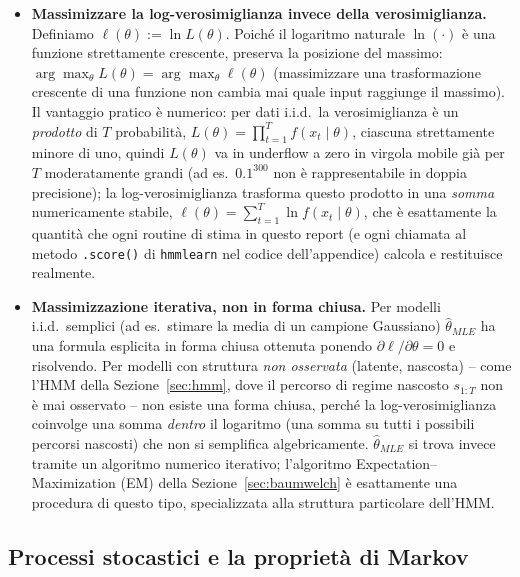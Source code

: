 \documentclass[11pt]{article}
\theoremstyle{definition}
\theoremstyle{remark}
\begin{document}
\begin{itemize}
    \item \textbf{Massimizzare la log-verosimiglianza invece della verosimiglianza.} Definiamo $\ell(\theta):=\ln L(\theta)$. Poich\'e il logaritmo naturale $\ln(\cdot)$ \`e una funzione strettamente crescente, preserva la posizione del massimo: $\arg\max_\theta L(\theta)=\arg\max_\theta \ell(\theta)$ (massimizzare una trasformazione crescente di una funzione non cambia mai quale input raggiunge il massimo). Il vantaggio pratico \`e numerico: per dati i.i.d.\ la verosimiglianza \`e un \emph{prodotto} di $T$ probabilit\`a, $L(\theta)=\prod_{t=1}^T f(x_t\mid\theta)$, ciascuna strettamente minore di uno, quindi $L(\theta)$ va in underflow a zero in virgola mobile gi\`a per $T$ moderatamente grandi (ad es.\ $0.1^{300}$ non \`e rappresentabile in doppia precisione); la log-verosimiglianza trasforma questo prodotto in una \emph{somma} numericamente stabile, $\ell(\theta)=\sum_{t=1}^T\ln f(x_t\mid\theta)$, che \`e esattamente la quantit\`a che ogni routine di stima in questo report (e ogni chiamata al metodo \texttt{.score()} di \texttt{hmmlearn} nel codice dell'appendice) calcola e restituisce realmente.
    \item \textbf{Massimizzazione iterativa, non in forma chiusa.} Per modelli i.i.d.\ semplici (ad es.\ stimare la media di un campione Gaussiano) $\widehat\theta_{MLE}$ ha una formula esplicita in forma chiusa ottenuta ponendo $\partial\ell/\partial\theta=0$ e risolvendo. Per modelli con struttura \emph{non osservata} (latente, nascosta) -- come l'HMM della Sezione~\ref{sec:hmm}, dove il percorso di regime nascosto $s_{1:T}$ non \`e mai osservato -- non esiste una forma chiusa, perch\'e la log-verosimiglianza coinvolge una somma \emph{dentro} il logaritmo (una somma su tutti i possibili percorsi nascosti) che non si semplifica algebricamente. $\widehat\theta_{MLE}$ si trova invece tramite un algoritmo numerico iterativo; l'algoritmo Expectation--Maximization (EM) della Sezione~\ref{sec:baumwelch} \`e esattamente una procedura di questo tipo, specializzata alla struttura particolare dell'HMM.
\end{itemize}

\subsection{Processi stocastici e la propriet\`a di Markov}
\label{sec:markov-prelim}
\end{document}
